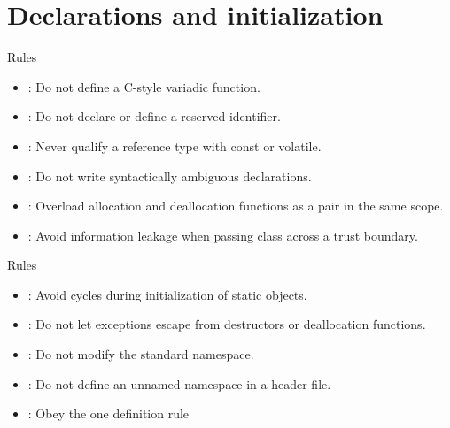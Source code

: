 \section{Declarations and initialization}

\begin{frame}[t]{Rules}
\begin{itemize}
  \item {}: Do not define a C-style variadic function.
  \vfill
  \item {}: Do not declare or define a reserved identifier.
  \vfill
  \item {}: Never qualify a reference type with const or volatile.
  \vfill
  \item {}: Do not write syntactically ambiguous declarations.
  \vfill
  \item {}: Overload allocation and deallocation functions as a pair in the same scope.
  \vfill
  \item {}: Avoid information leakage when passing class across a trust boundary.
\end{itemize}
\end{frame}


\begin{frame}[t]{Rules}
\begin{itemize}
  \item {}: Avoid cycles during initialization of static objects.
  \vfill
  \item {}: Do not let exceptions escape from destructors or deallocation functions.
  \vfill
  \item {}: Do not modify the standard namespace.
  \vfill
  \item {}: Do not define an unnamed namespace in a header file.
  \vfill
  \item {}: Obey the one definition rule
\end{itemize}
\end{frame}


